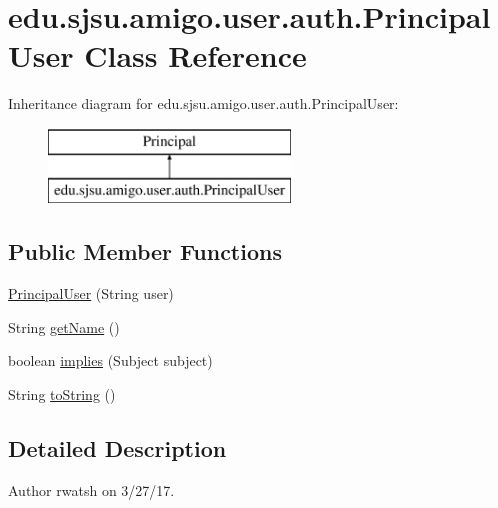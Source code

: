 \hypertarget{classedu_1_1sjsu_1_1amigo_1_1user_1_1auth_1_1_principal_user}{}\section{edu.\+sjsu.\+amigo.\+user.\+auth.\+Principal\+User Class Reference}
\label{classedu_1_1sjsu_1_1amigo_1_1user_1_1auth_1_1_principal_user}
Inheritance diagram for edu.\+sjsu.\+amigo.\+user.\+auth.\+Principal\+User\+:\begin{figure}[H]
\begin{center}
\leavevmode
\includegraphics[height=2.000000cm]{classedu_1_1sjsu_1_1amigo_1_1user_1_1auth_1_1_principal_user}
\end{center}
\end{figure}
\subsection*{Public Member Functions}
\begin{DoxyCompactItemize}
\item 
\hyperlink{classedu_1_1sjsu_1_1amigo_1_1user_1_1auth_1_1_principal_user_ae5eba540732f4b69565562553eee919a}{Principal\+User} (String user)
\item 
String \hyperlink{classedu_1_1sjsu_1_1amigo_1_1user_1_1auth_1_1_principal_user_af047281f43d613d809919b49084726ee}{get\+Name} ()
\item 
boolean \hyperlink{classedu_1_1sjsu_1_1amigo_1_1user_1_1auth_1_1_principal_user_ae5d437f606022a8c2a46dbf808fa5685}{implies} (Subject subject)
\item 
String \hyperlink{classedu_1_1sjsu_1_1amigo_1_1user_1_1auth_1_1_principal_user_ae29192bb7ec56a93c4241e9cc4ad7876}{to\+String} ()
\end{DoxyCompactItemize}


\subsection{Detailed Description}
\begin{DoxyAuthor}{Author}
rwatsh on 3/27/17. 
\end{DoxyAuthor}


